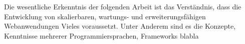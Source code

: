 

Die wesentliche Erkenntnis der folgenden Arbeit ist das Verständnis, dass die Entwicklung von skalierbaren, wartungs- und erweiterungsfähigen Webanwendungen Vieles voraussetzt. Unter Anderem sind es die Konzepte, Kenntnisse mehrerer Programmiersprachen, Frameworks blabla


